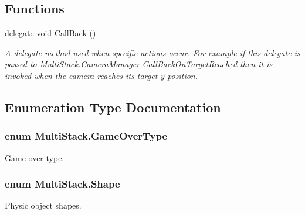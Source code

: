 \subsection*{Functions}
\begin{DoxyCompactItemize}
\item 
delegate void \hyperlink{namespace_multi_stack_a4bd4097b52deebcafccf5815a8495960}{Call\+Back} ()
\begin{DoxyCompactList}\small\item\em A delegate method used when specific actions occur. For example if this delegate is passed to \hyperlink{class_multi_stack_1_1_camera_manager_a3085f8ea5bbe1beb88a3219eba1e51bf}{Multi\+Stack.\+Camera\+Manager.\+Call\+Back\+On\+Target\+Reached} then it is invoked when the camera reaches its target y position. \end{DoxyCompactList}\end{DoxyCompactItemize}


\subsection{Enumeration Type Documentation}
\hypertarget{namespace_multi_stack_a19d387de624d6945620427c53c4f0c10}{}
\subsubsection[{Game\+Over\+Type}]{\setlength{\rightskip}{0pt plus 5cm}enum {\bf Multi\+Stack.\+Game\+Over\+Type}\hspace{0.3cm}{\ttfamily [strong]}}\label{namespace_multi_stack_a19d387de624d6945620427c53c4f0c10}


Game over type. 

\hypertarget{namespace_multi_stack_ac7f637887fea673ceeae6fdd0598c048}{}
\subsubsection[{Shape}]{\setlength{\rightskip}{0pt plus 5cm}enum {\bf Multi\+Stack.\+Shape}\hspace{0.3cm}{\ttfamily [strong]}}\label{namespace_multi_stack_ac7f637887fea673ceeae6fdd0598c048}


Physic object shapes. 




